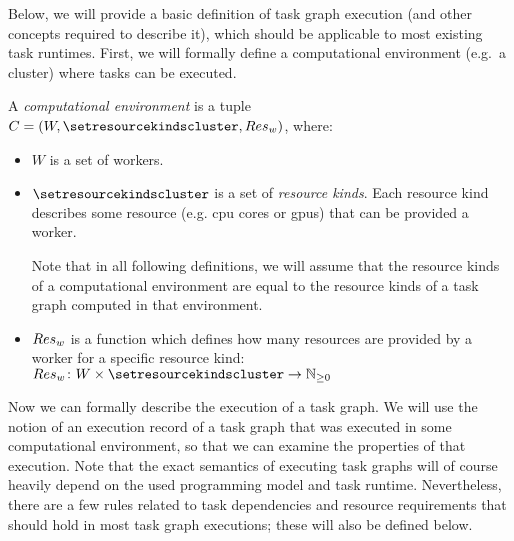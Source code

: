Below, we will provide a basic definition of task graph execution (and other concepts required to
describe it), which should be applicable to most existing task runtimes. First, we will formally
define a computational environment (e.g.\ a cluster) where tasks can be executed.

\vspace{2mm} A \emph{computational environment} is a tuple
$C = (W, \setresourcekindscluster, \fnworkerres)$, where:
\begin{itemize}[itemsep=0pt]
	\item $W$ is a set of workers.
	\item $\setresourcekindscluster$ is a set of \emph{resource kinds}. Each resource kind
	      describes some resource (e.g. \gls{cpu} cores or \glspl{gpu}) that can be
	      provided a worker.

	      Note that in all following definitions, we will assume that the resource kinds of a computational
	      environment are equal to the resource kinds of a task graph computed in that environment.
	\item $Res_w$ is a function which defines how many resources are
	      provided by a worker for a specific resource kind: \\ $\fnworkerres\colon W \times \setresourcekindscluster \rightarrow
		      \mathbb{N}_{\geq{}0}$
\end{itemize}

Now we can formally describe the execution of a task graph. We will use the notion of an execution
record of a task graph that was executed in some computational environment, so that we can examine
the properties of that execution. Note that the exact semantics of executing task graphs will of
course heavily depend on the used programming model and task runtime. Nevertheless, there are a few
rules related to task dependencies and resource requirements that should hold in most task graph
executions; these will also be defined below.

